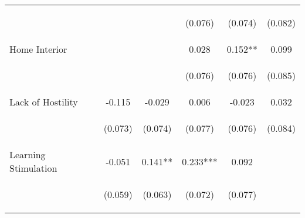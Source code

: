 \begin{tabular}{lccccc}
 & \begin{footnotesize}\end{footnotesize} & \begin{footnotesize}\end{footnotesize} & \begin{footnotesize}(0.076)\end{footnotesize} & \begin{footnotesize}(0.074)\end{footnotesize} & \begin{footnotesize}(0.082)\end{footnotesize}\\
\noalign{\smallskip}Home Interior &  &  & 0.028 & 0.152** & 0.099\\
 & \begin{footnotesize}\end{footnotesize} & \begin{footnotesize}\end{footnotesize} & \begin{footnotesize}(0.076)\end{footnotesize} & \begin{footnotesize}(0.076)\end{footnotesize} & \begin{footnotesize}(0.085)\end{footnotesize}\\
\noalign{\smallskip}Lack of Hostility & -0.115 & -0.029 & 0.006 & -0.023 & 0.032\\
 & \begin{footnotesize}(0.073)\end{footnotesize} & \begin{footnotesize}(0.074)\end{footnotesize} & \begin{footnotesize}(0.077)\end{footnotesize} & \begin{footnotesize}(0.076)\end{footnotesize} & \begin{footnotesize}(0.084)\end{footnotesize}\\
\noalign{\smallskip}Learning Stimulation & -0.051 & 0.141** & 0.233*** & 0.092 & \\
 & \begin{footnotesize}(0.059)\end{footnotesize} & \begin{footnotesize}(0.063)\end{footnotesize} & \begin{footnotesize}(0.072)\end{footnotesize} & \begin{footnotesize}(0.077)\end{footnotesize} & \begin{footnotesize}\end{footnotesize}\\

\end{tabular}
